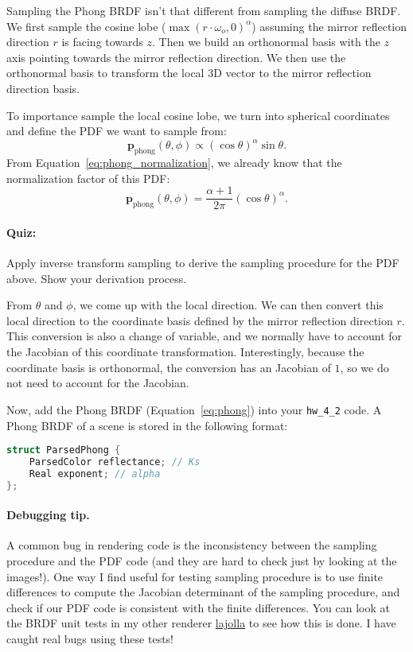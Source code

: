 Sampling the Phong BRDF isn't that different from sampling the diffuse BRDF. We first sample the cosine lobe ($\max\left(r \cdot \omega_o, 0\right)^\alpha$) assuming the mirror reflection direction $r$ is facing towards $z$. Then we build an orthonormal basis with the $z$ axis pointing towards the mirror reflection direction. We then use the orthonormal basis to transform the local 3D vector to the mirror reflection direction basis.

To importance sample the local cosine lobe, we turn into spherical coordinates and define the PDF we want to sample from:
\begin{equation}
\mathbf{p}_{\text{phong}}(\theta, \phi) \propto \left(\cos\theta\right)^{\alpha} \sin\theta.
\end{equation}
From Equation~\eqref{eq:phong_normalization}, we already know that the normalization factor of this PDF:
\begin{equation}
\mathbf{p}_{\text{phong}}(\theta, \phi) = \frac{\alpha + 1}{2\pi}\left(\cos\theta\right)^{\alpha}.
\end{equation}

\paragraph{Quiz:} Apply inverse transform sampling to derive the sampling procedure for the PDF above. Show your derivation process.

From $\theta$ and $\phi$, we come up with the local direction. We can then convert this local direction to the coordinate basis defined by the mirror reflection direction $r$. This conversion is also a change of variable, and we normally have to account for the Jacobian of this coordinate transformation. Interestingly, because the coordinate basis is orthonormal, the conversion has an Jacobian of $1$, so we do not need to account for the Jacobian.

Now, add the Phong BRDF (Equation~\eqref{eq:phong}) into your \lstinline{hw_4_2} code. A Phong BRDF of a scene is stored in the following format:
\begin{lstlisting}[language=C++]
struct ParsedPhong {
    ParsedColor reflectance; // Ks
    Real exponent; // alpha
};
\end{lstlisting}

\paragraph{Debugging tip.} A common bug in rendering code is the inconsistency between the sampling procedure and the PDF code (and they are hard to check just by looking at the images!). One way I find useful for testing sampling procedure is to use finite differences to compute the Jacobian determinant of the sampling procedure, and check if our PDF code is consistent with the finite differences. You can look at the BRDF unit tests in my other renderer \href{https://github.com/BachiLi/lajolla_public/blob/main/src/tests/materials.cpp}{lajolla} to see how this is done. I have caught real bugs using these tests!

